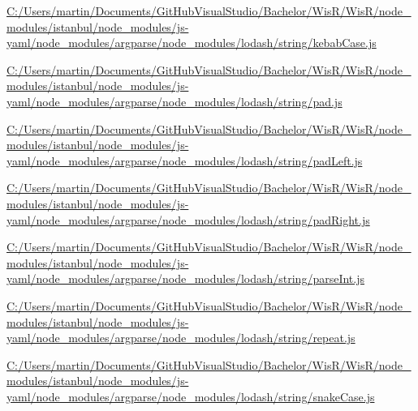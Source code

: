 \begin{DoxyCompactItemize}
\item 
\hyperlink{_c_1_2_users_2martin_2_documents_2_git_hub_visual_studio_2_bachelor_2_wis_r_2_wis_r_2node_modulebef9863078a16b98c79d2b0e5f9b178f}{C\+:/\+Users/martin/\+Documents/\+Git\+Hub\+Visual\+Studio/\+Bachelor/\+Wis\+R/\+Wis\+R/node\+\_\+modules/istanbul/node\+\_\+modules/js-\/yaml/node\+\_\+modules/argparse/node\+\_\+modules/lodash/string/kebab\+Case.\+js}
\item 
\hyperlink{_c_1_2_users_2martin_2_documents_2_git_hub_visual_studio_2_bachelor_2_wis_r_2_wis_r_2node_module68d77ac3a1b995dacbc4dfd117bc1ecb}{C\+:/\+Users/martin/\+Documents/\+Git\+Hub\+Visual\+Studio/\+Bachelor/\+Wis\+R/\+Wis\+R/node\+\_\+modules/istanbul/node\+\_\+modules/js-\/yaml/node\+\_\+modules/argparse/node\+\_\+modules/lodash/string/pad.\+js}
\item 
\hyperlink{_c_1_2_users_2martin_2_documents_2_git_hub_visual_studio_2_bachelor_2_wis_r_2_wis_r_2node_moduleb39fb5270d626ef44d9a7f3252ed491e}{C\+:/\+Users/martin/\+Documents/\+Git\+Hub\+Visual\+Studio/\+Bachelor/\+Wis\+R/\+Wis\+R/node\+\_\+modules/istanbul/node\+\_\+modules/js-\/yaml/node\+\_\+modules/argparse/node\+\_\+modules/lodash/string/pad\+Left.\+js}
\item 
\hyperlink{_c_1_2_users_2martin_2_documents_2_git_hub_visual_studio_2_bachelor_2_wis_r_2_wis_r_2node_module2801323cf7cf90a13ce107e52baf34ad}{C\+:/\+Users/martin/\+Documents/\+Git\+Hub\+Visual\+Studio/\+Bachelor/\+Wis\+R/\+Wis\+R/node\+\_\+modules/istanbul/node\+\_\+modules/js-\/yaml/node\+\_\+modules/argparse/node\+\_\+modules/lodash/string/pad\+Right.\+js}
\item 
\hyperlink{_c_1_2_users_2martin_2_documents_2_git_hub_visual_studio_2_bachelor_2_wis_r_2_wis_r_2node_module1276245f39290faf8b455f7526cc9149}{C\+:/\+Users/martin/\+Documents/\+Git\+Hub\+Visual\+Studio/\+Bachelor/\+Wis\+R/\+Wis\+R/node\+\_\+modules/istanbul/node\+\_\+modules/js-\/yaml/node\+\_\+modules/argparse/node\+\_\+modules/lodash/string/parse\+Int.\+js}
\item 
\hyperlink{_c_1_2_users_2martin_2_documents_2_git_hub_visual_studio_2_bachelor_2_wis_r_2_wis_r_2node_module161f6b309a3469cb13a2f0458b2c6821}{C\+:/\+Users/martin/\+Documents/\+Git\+Hub\+Visual\+Studio/\+Bachelor/\+Wis\+R/\+Wis\+R/node\+\_\+modules/istanbul/node\+\_\+modules/js-\/yaml/node\+\_\+modules/argparse/node\+\_\+modules/lodash/string/repeat.\+js}
\item 
\hyperlink{_c_1_2_users_2martin_2_documents_2_git_hub_visual_studio_2_bachelor_2_wis_r_2_wis_r_2node_module84a5676d68d610d57011e5b68c0e1326}{C\+:/\+Users/martin/\+Documents/\+Git\+Hub\+Visual\+Studio/\+Bachelor/\+Wis\+R/\+Wis\+R/node\+\_\+modules/istanbul/node\+\_\+modules/js-\/yaml/node\+\_\+modules/argparse/node\+\_\+modules/lodash/string/snake\+Case.\+js}

\end{DoxyCompactItemize}
